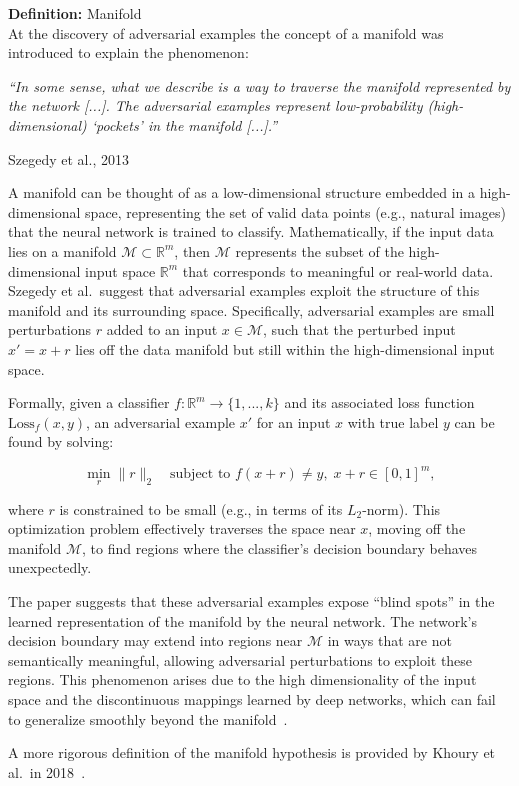 \documentclass[a4paper, oneside]{discothesis}
\begin{document}
\begin{highlightbox}
	\textbf{Definition:} Manifold \\
	
	At the discovery of adversarial examples the concept of a manifold was introduced to explain the phenomenon:
	
	\begin{flushright}
		\textit{``In some sense, what we describe is a way to traverse the manifold represented by the network [...]. The adversarial examples represent low-probability (high-dimensional) `pockets' in the manifold [...].''}
		
		\textemdash{} Szegedy et al., 2013~\cite{szegedy2013intriguing}
	\end{flushright}	
		
	A manifold can be thought of as a low-dimensional structure embedded in a high-dimensional space, representing the set of valid data points (e.g., natural images) that the neural network is trained to classify. Mathematically, if the input data lies on a manifold $\mathcal{M} \subset \mathbb{R}^m$, then $\mathcal{M}$ represents the subset of the high-dimensional input space $\mathbb{R}^m$ that corresponds to meaningful or real-world data. \\

	Szegedy et al.\ suggest that adversarial examples exploit the structure of this manifold and its surrounding space. Specifically, adversarial examples are small perturbations $r$ added to an input $x \in \mathcal{M}$, such that the perturbed input $x' = x + r$ lies off the data manifold but still within the high-dimensional input space.
	
	Formally, given a classifier $f: \mathbb{R}^m \to \{1, ..., k\}$ and its associated loss function $\text{Loss}_f(x, y)$, an adversarial example $x'$ for an input $x$ with true label $y$ can be found by solving:
	
	$$
	\min_{r} \|r\|_2 \quad \text{subject to } f(x + r) \neq y, \; x + r \in [0, 1]^m,
	$$
	
	where $r$ is constrained to be small (e.g., in terms of its $L_2$-norm). This optimization problem effectively traverses the space near $x$, moving off the manifold $\mathcal{M}$, to find regions where the classifier's decision boundary behaves unexpectedly.
	
	The paper suggests that these adversarial examples expose ``blind spots'' in the learned representation of the manifold by the neural network. The network's decision boundary may extend into regions near $\mathcal{M}$ in ways that are not semantically meaningful, allowing adversarial perturbations to exploit these regions. This phenomenon arises due to the high dimensionality of the input space and the discontinuous mappings learned by deep networks, which can fail to generalize smoothly beyond the manifold~\cite{khoury2018geometry, Jha2018DetectingAE, Sha2020ADA, dube2018high, shamir2021dimpled}.
	
	A more rigorous definition of the manifold hypothesis is provided by Khoury et al.\ in 2018~\cite{khoury2018geometry}.
\end{highlightbox}
\end{document}
